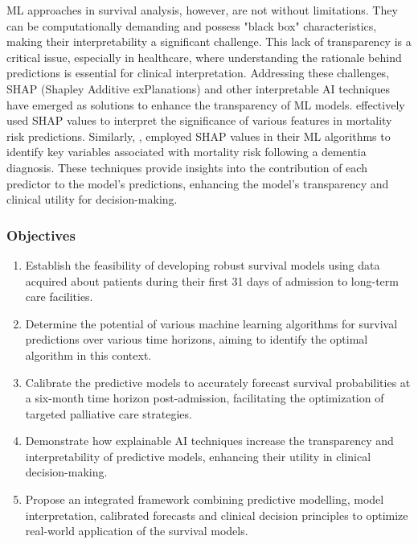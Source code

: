\documentclass{article}
\begin{document}
ML approaches in survival analysis, however, are not without limitations. They can be computationally demanding and possess "black box" characteristics, making their interpretability a significant challenge. This lack of transparency is a critical issue, especially in healthcare, where understanding the rationale behind predictions is essential for clinical interpretation. Addressing these challenges, SHAP (Shapley Additive exPlanations) and other interpretable AI techniques have emerged as solutions to enhance the transparency of ML models. \citet{wang2019development,blanes2021responsive} effectively used SHAP values to interpret the significance of various features in mortality risk predictions. Similarly, \citet{mostafaei2023machine}, employed SHAP values in their ML algorithms to identify key variables associated with mortality risk following a dementia diagnosis. These techniques provide insights into the contribution of each predictor to the model's predictions, enhancing the model's transparency and clinical utility for decision-making.



\subsubsection*{Objectives}
\begin{enumerate}
    \item Establish the feasibility of developing robust survival models using data acquired about patients during their first 31 days of admission to long-term care facilities.
    \item Determine the potential of various machine learning algorithms for survival predictions over various time horizons, aiming to identify the optimal algorithm in this context.
    \item Calibrate the predictive models to accurately forecast survival probabilities at a six-month time horizon post-admission, facilitating the optimization of targeted palliative care strategies.
    \item Demonstrate how explainable AI techniques increase the transparency and interpretability of predictive models, enhancing their utility in clinical decision-making.
    \item Propose an integrated framework combining predictive modelling, model interpretation, calibrated forecasts and clinical decision principles to optimize real-world application of the survival models.

\end{enumerate}
\end{document}
